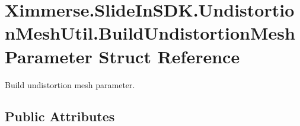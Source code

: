 \hypertarget{struct_ximmerse_1_1_slide_in_s_d_k_1_1_undistortion_mesh_util_1_1_build_undistortion_mesh_parameter}{}\section{Ximmerse.\+Slide\+In\+S\+D\+K.\+Undistortion\+Mesh\+Util.\+Build\+Undistortion\+Mesh\+Parameter Struct Reference}
\label{struct_ximmerse_1_1_slide_in_s_d_k_1_1_undistortion_mesh_util_1_1_build_undistortion_mesh_parameter}


Build undistortion mesh parameter.  


\subsection*{Public Attributes}
